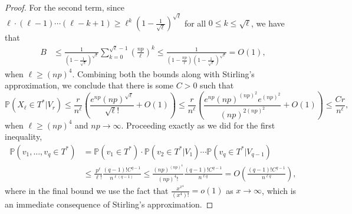 \documentclass[10pt,a4paper]{amsart}
\newcommand{\prob}{\mathbb{P}} %
\begin{document}
\begin{proof}
For the second term, since $\ell \cdot (\ell-1) \cdots (\ell - k + 1) \geq \ell^{k}(1-\frac{1}{\sqrt{\ell}})^{\sqrt{\ell}}$ for all $0 \leq k \leq \sqrt{\ell}$, we have that
\begin{align*}
    B &\leq \frac{1}{\left(1-\frac{1}{\sqrt{\ell}}\right)^{\sqrt{\ell}}}\sum_{k=0}^{\sqrt{\ell}-1} \left(\frac{np}{\ell}\right)^k \leq \frac{1}{\left(1-\frac{np}{\ell}\right)\left(1-\frac{1}{\sqrt{\ell}}\right)^{\sqrt{\ell}}} = O(1),
\end{align*}
when $\ell \geq (np)^4$. Combining both the bounds along with Stirling's approximation, we conclude that there is some $C > 0$ such that
$$
\prob(X_\ell \in T^* | V_r) 
\leq \frac{r}{n^\ell}\left(\frac{e^{np}(np)^{\sqrt{\ell}}}{\sqrt{\ell}!} + O(1)\right) \leq \frac{r}{n^\ell}\left(\frac{e^{np}(np)^{(np)^2}e^{(np)^2}}{(np)^{2(np)^2}}+O(1)\right) \leq \frac{Cr}{n^\ell},$$
when $\ell \geq (np)^4$ and $np \to \infty$. Proceeding exactly as we did for the first inequality,
\begin{align*}
\prob(v_1,\ldots,v_q \in T^*) &= \prob(v_1 \in T^*) \cdot \prob(v_2 \in T^* | V_1) \cdots \prob(v_q \in T^* | V_{q-1}) \\
&\leq \frac{p^\ell}{\ell!}\frac{(q-1)!C^{q-1}}{n^{\ell (q-1)}} \leq \frac{(np)^{(np)^4}}{(np)^4!}\frac{(q-1)!C^{q-1}}{n^{\ell q}} = O\left( \frac{(q-1)!C^{q-1}}{n^{\ell q}}\right),
\end{align*} 
where in the final bound we use the fact that $\frac{x^{x^4}}{(x^4)!} = o(1)$ as $x\to \infty$, which is an immediate consequence of Stirling's approximation.
\end{proof}
\end{document}
